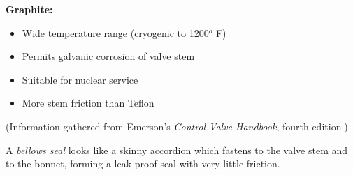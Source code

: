 \vskip 10pt

\noindent
{\bf Graphite:}

\begin{itemize}
\item{} Wide temperature range (cryogenic to 1200$^{o}$ F)
\item{} Permits galvanic corrosion of valve stem
\item{} Suitable for nuclear service
\item{} More stem friction than Teflon
\end{itemize}

\vskip 10pt

(Information gathered from Emerson's {\it Control Valve Handbook}, fourth edition.)

\vskip 10pt

A {\it bellows seal} looks like a skinny accordion which fastens to the valve stem and to the bonnet, forming a leak-proof seal with very little friction.




